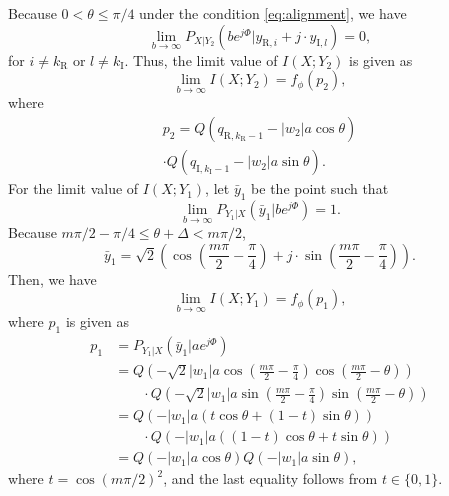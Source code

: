 \documentclass[journal]{IEEEtran}
\begin{document}
\begin{IEEEproof}
Because $0<\theta\leq \pi/4$ under the condition \eqref{eq:alignment}, we have 
\begin{equation}
    \lim\limits_{b\rightarrow\infty}P_{X|Y_2}(be^{j\Phi}|y_{\mathrm{R},i}+j\cdot y_{\mathrm{I},l}) = 0,
\end{equation}
for $i\neq k_{\mathrm{R}}$ or $l \neq k_{\mathrm{I}}$. Thus, the limit value of $I(X;Y_2)$ is given as 
\begin{equation}
    \lim\limits_{b\rightarrow \infty} I(X;Y_2) = f_\phi(p_2),
\end{equation}
where
\begin{multline}
    p_2 = Q\left( q_{\mathrm{R},k_{\mathrm{R}}-1}-|w_2|a\cos\theta \right)
    \\ \cdot Q\left( q_{\mathrm{I},k_{\mathrm{I}}-1}-|w_2|a\sin\theta \right). \label{eq:x2}
\end{multline}
For the limit value of $I(X;Y_1)$, let $\bar{y}_1$ be the point such that
\begin{equation}
    \lim\limits_{b\rightarrow \infty} P_{Y_1|X}(\bar{y}_1|be^{j\Phi})=1.
\end{equation}
Because $m\pi/2-\pi/4\leq\theta+\Delta<m\pi/2$,
\begin{equation}
    \bar{y}_1 = \sqrt{2}\left(\cos \left( \frac{m \pi}{2} - \frac{\pi}{4} \right) + j \cdot \sin \left( \frac{m \pi}{2} - \frac{\pi}{4} \right) \right).
\end{equation}
Then, we have 
\begin{equation}
    \lim\limits_{b\rightarrow \infty} I(X;Y_1) = f_\phi(p_1),
\end{equation}
where $p_1$ is given as 
\begin{align}
    p_1 &= P_{Y_1|X}(\bar{y}_1|ae^{j\Phi})
    \\& = Q\left( -\sqrt{2}|w_1|a\cos \left( \frac{m \pi}{2} - \frac{\pi}{4} \right)\cos \left( \frac{m \pi}{2} - \theta \right)  \right)
    \\& \quad\quad \cdot Q\left( -\sqrt{2}|w_1|a\sin \left( \frac{m \pi}{2} - \frac{\pi}{4} \right)\sin \left( \frac{m \pi}{2} - \theta \right)  \right) \nonumber
    \\& = Q\left(-|w_1|a\left(t  \cos \theta  + (1-t)  \sin \theta\right)  \right)
    \\& \quad\quad \cdot Q\left(-|w_1|a\left((1-t)  \cos \theta  + t  \sin \theta\right)  \right) \nonumber
    \\& = Q(-|w_1|a \cos \theta) Q(-|w_1|a \sin \theta), \label{eq:x1}
\end{align}
where $t = \cos (m \pi /2)^2$, and the last equality follows from $t \in \{0,1\}$.


\end{IEEEproof}
\end{document}
